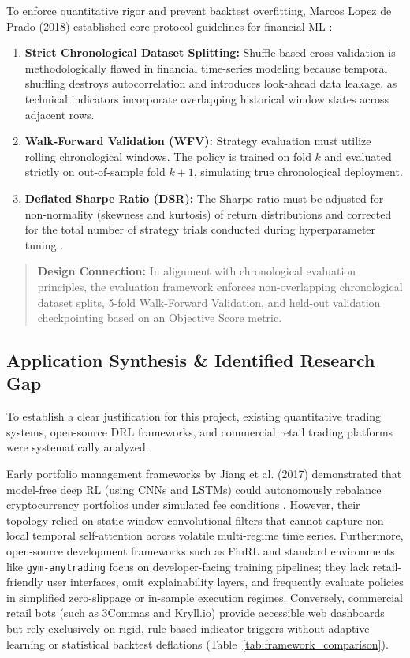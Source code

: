 \documentclass[11pt,a4paper]{article}
\newenvironment{callout}{%
  \par\vspace{8pt}
  \noindent\makebox[\linewidth]{\rule{\linewidth}{0.6pt}}\vspace{-4pt}
  \begin{quote}\small
}{%
  \end{quote}\vspace{-6pt}
  \noindent\makebox[\linewidth]{\rule{\linewidth}{0.6pt}}\vspace{8pt}
}
\begin{document}
To enforce quantitative rigor and prevent backtest overfitting, Marcos Lopez de Prado (2018) established core protocol guidelines for financial ML \cite{lopezdeprado2018,bailey2014dsr}:
\begin{enumerate}[leftmargin=2em]
    \item \textbf{Strict Chronological Dataset Splitting:} Shuffle-based cross-validation is methodologically flawed in financial time-series modeling because temporal shuffling destroys autocorrelation and introduces look-ahead data leakage, as technical indicators incorporate overlapping historical window states across adjacent rows.
    \item \textbf{Walk-Forward Validation (WFV):} Strategy evaluation must utilize rolling chronological windows. The policy is trained on fold $k$ and evaluated strictly on out-of-sample fold $k+1$, simulating true chronological deployment.
    \item \textbf{Deflated Sharpe Ratio (DSR):} The Sharpe ratio must be adjusted for non-normality (skewness and kurtosis) of return distributions and corrected for the total number of strategy trials conducted during hyperparameter tuning \cite{bailey2014dsr}.
\end{enumerate}

\begin{callout}
\textbf{Design Connection:} In alignment with chronological evaluation principles, the evaluation framework enforces non-overlapping chronological dataset splits, 5-fold Walk-Forward Validation, and held-out validation checkpointing based on an Objective Score metric.
\end{callout}

\subsection{Application Synthesis \& Identified Research Gap}
To establish a clear justification for this project, existing quantitative trading systems, open-source DRL frameworks, and commercial retail trading platforms were systematically analyzed. 

Early portfolio management frameworks by Jiang et al. (2017) demonstrated that model-free deep RL (using CNNs and LSTMs) could autonomously rebalance cryptocurrency portfolios under simulated fee conditions \cite{jiang2017}. However, their topology relied on static window convolutional filters that cannot capture non-local temporal self-attention across volatile multi-regime time series. Furthermore, open-source development frameworks such as FinRL \cite{liu2021} and standard environments like \texttt{gym-anytrading} focus on developer-facing training pipelines; they lack retail-friendly user interfaces, omit explainability layers, and frequently evaluate policies in simplified zero-slippage or in-sample execution regimes. Conversely, commercial retail bots (such as 3Commas and Kryll.io) provide accessible web dashboards but rely exclusively on rigid, rule-based indicator triggers without adaptive learning or statistical backtest deflations (Table~\ref{tab:framework_comparison}).
\end{document}
